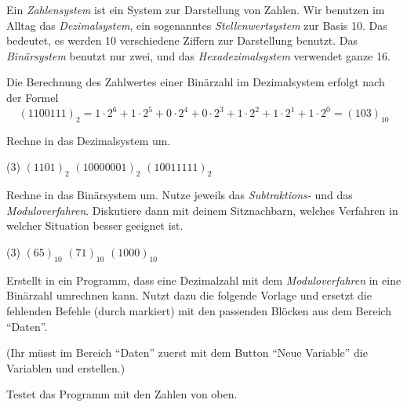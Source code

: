 \documentclass[10pt, a4paper]{arbeitsblatt}
\begin{document}
\ReiheTitel

Ein \emph{Zahlensystem} ist ein System zur Darstellung von Zahlen. Wir
benutzen im Alltag das \emph{Dezimalsystem}, ein sogenanntes
\emph{Stellenwertsystem} zur Basis 10. Das bedeutet, es werden 10 verschiedene
Ziffern zur Darstellung benutzt. Das \emph{Binärsystem} benutzt nur zwei,
und das \emph{Hexadezimalsystem} verwendet ganze 16.

Die Berechnung des Zahlwertes einer Binärzahl im Dezimalsystem erfolgt nach der
Formel \[ (1100111)_2 = 1\cdot 2^6 + 1\cdot 2^5 + 0\cdot 2^4 + 0\cdot 2^3 + 1\cdot 2^2 +
	1\cdot 2^1 + 1\cdot 2^0 = (103)_{10} \]

\begin{aufgabe}[icon=\iconHeft]
	Rechne in das Dezimalsystem um.
	\begin{tasks}(3)
		\task $(1101)_2$
		\task $(1000 0001)_2$
		\task $(1001 1111)_2$
	\end{tasks}
\end{aufgabe}

\begin{aufgabe}[icon=\iconHeft\,\iconPartner]
	Rechne in das Binärsystem um. Nutze jeweils das
	\emph{Subtraktions-} und das \emph{Moduloverfahren}. Diskutiere dann mit
	deinem Sitznachbarn, welches Verfahren in welcher Situation besser geeignet
	ist.
	\begin{tasks}(3)
		\task $(65)_{10}$
		\task $(71)_{10}$
		\task $(1000)_{10}$
	\end{tasks}
\end{aufgabe}

\begin{aufgabe}[icon=\iconLaptop\,\iconPartner]
	Erstellt in  ein Programm, dass
	eine Dezimalzahl mit dem \emph{Moduloverfahren} in eine Binärzahl umrechnen
	kann. Nutzt dazu die folgende Vorlage und ersetzt die fehlenden Befehle (durch
	 markiert) mit den passenden Blöcken aus dem Bereich
	\enquote{Daten}.

	(Ihr müsst im Bereich \enquote{Daten} zuerst mit dem Button
	\enquote{Neue Variable} die Variablen  und
	 erstellen.)

	\begin{center}
	\end{center}

	Testet das Programm mit den Zahlen von oben.
\end{aufgabe}
\end{document}
